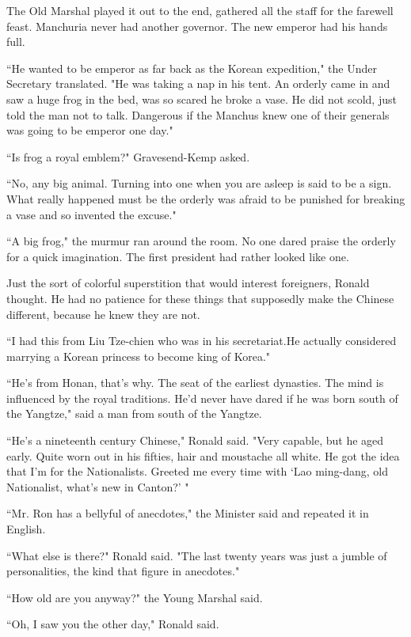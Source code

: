 \par The Old Marshal played it out to the end, gathered all the staff for the farewell feast. Manchuria never had another governor. The new emperor had his hands full.
\par ``He wanted to be emperor as far back as the Korean expedition," the Under Secretary translated. "He was taking a nap in his tent. An orderly came in and saw a huge frog in the bed, was so scared he broke a vase. He did not scold, just told the man not to talk. Dangerous if the Manchus knew one of their generals was going to be emperor one day."
\par ``Is frog a royal emblem?" Gravesend-Kemp asked.
\par ``No, any big animal. Turning into one when you are asleep is said to be a sign. What really happened must be the orderly was afraid to be punished for breaking a vase and so invented the excuse."
\par ``A big frog," the murmur ran around the room. No one dared praise the orderly for a quick imagination. The first president had rather looked like one.
\par Just the sort of colorful superstition that would interest foreigners, Ronald thought. He had no patience for these things that supposedly make the Chinese different, because he knew they are not.
\par ``I had this from Liu Tze-chien who was in his secretariat.He actually considered marrying a Korean princess to become king of Korea."
\par ``He's from Honan, that's why. The seat of the earliest dynasties. The mind is influenced by the royal traditions. He'd never have dared if he was born south of the Yangtze," said a man from south of the Yangtze.
\par ``He's a nineteenth century Chinese," Ronald said. "Very capable, but he aged early. Quite worn out in his fifties, hair and moustache all white. He got the idea that I'm for the Nationalists. Greeted me every time with ‘Lao ming-dang, old Nationalist, what's new in Canton?' "
\par ``Mr. Ron has a bellyful of anecdotes," the Minister said and repeated it in English.
\par ``What else is there?" Ronald said. "The last twenty years was just a jumble of personalities, the kind that figure in anecdotes."
\par ``How old are you anyway?" the Young Marshal said.
\par ``Oh, I saw you the other day," Ronald said.
